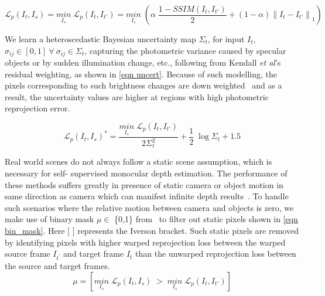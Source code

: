 \documentclass{bmvc2k}
\def\etal{\emph{et al}\bmvaOneDot}
\begin{document}
\begin{equation}
\mathcal{L}_{p}(I_{t}, I_{s}) = \underset{I_{s}}{min}\;\mathcal{L}_{p}(I_{t}, I_{t'}) = \underset{I_{s}}{min}\;\left (\alpha \; \frac{1-SSIM(I_{t}, I_{t'})}{2} + (1- \alpha)\left \| I_{t}- I_{t'} \right \|_{1} \right)
\label{eqn photo}
\end{equation}

We learn a heteroscedastic Bayesian uncertainty map $\Sigma_t$, for input $I_t$, $\sigma_{ij} \in [0,1] \ \forall \ \sigma_{ij} \in \Sigma_t$, capturing the photometric variance caused by specular objects or by sudden illumination change, etc., following from Kendall \etal's~\cite{kendall2018multi} residual weighting, as shown in \autoref{eqn uncert}. Because of such modelling, the pixels corresponding to such brightness changes are down weighted~\cite{yang2020d3vo} and as a result, the uncertainty values are higher at regions with high photometric reprojection error. 


\begin{equation}
\mathcal{L}_{p}(I_{t}, I_{s})^* = \frac {\underset{I_{s}}{min} \; \mathcal{L}_{p}(I_{t}, I_{t'})}{2\Sigma_t^2} + \frac{1}{2} \; \log {\Sigma_t}+1.5
\label{eqn uncert}
\end{equation}

Real world scenes do not always follow a static scene assumption, which is necessary for self- supervised monocular depth estimation. The performance of these methods suffers greatly in presence of static camera or object motion in same direction as camera which can manifest infinite depth results~\cite{godard2019digging}. To handle such scenarios where the relative motion between camera and objects is zero, we make use of binary mask $\mu \in$ \{0,1\} from~\cite{godard2019digging} to filter out static pixels shown in \autoref{eqn bin_mask}. Here [ ] represents the Iverson bracket. Such static pixels are removed by identifying pixels with higher warped reprojection loss between the warped source frame $I_{t^{'}}$ and target frame $I_t$ than the unwarped reprojection loss between the source and target frames.
\begin{equation}
\mu = \left [ \underset{I_{s}}{min} \; \mathcal{L}_{p}(I_{t}, I_{s}) \; > \; \underset{I_{s}}{min} \; \mathcal{L}_{p}(I_{t}, I_{t'})\right]
\label{eqn bin_mask}
\end{equation}
\end{document}
